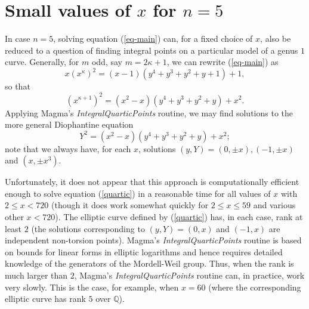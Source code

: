  \section{Small values of $x$ for $n=5$} \label{TM}
 
 In case $n=5$, solving equation (\ref{eq-main}) can, for a fixed choice of $x$, also be reduced to a question of finding integral points on a particular model of a genus $1$ curve.
 Generally, for $m$ odd, say $m= 2 \kappa+1$, we can rewrite  (\ref{eq-main}) as
 $$
 x \left( x^{\kappa} \right)^2 = (x-1) \left( y^4+y^3+y^2+y+1 \right) + 1,
 $$
 so that 
 $$
 \left( x^{\kappa+1} \right)^2 = (x^2-x) \left( y^4+y^3+y^2+y \right) + x^2.
 $$
 Applying Magma's {\it IntegralQuarticPoints} routine, 
 we may find solutions to the more general Diophantine equation
 \begin{equation} \label{quartic}
 Y^2 = (x^2-x) \left( y^4+y^3+y^2+y \right) + x^2;
 \end{equation}
 note that we always have, for each $x$, solutions $(y,Y) = (0, \pm x), (-1, \pm x)$ and $(x, \pm x^3)$. 
 
 Unfortunately, it does not appear that this approach is computationally efficient enough to solve equation (\ref{quartic}) in a reasonable time for all values of $x$ with  $2 \leq x < 720$ (though it does work somewhat quickly for $2 \leq x \leq 59$ and various other $x < 720$). The elliptic curve defined by (\ref{quartic}) has, in each case, rank at least $2$ (the solutions corresponding to $(y,Y) = (0, x)$ and $(-1, x)$ are independent non-torsion points). Magma's {\it IntegralQuarticPoints} routine is based on bounds for  linear forms in elliptic logarithms and hence requires detailed knowledge of the generators of the Mordell-Weil group. Thus, when the rank is much larger than $2$, Magma's   {\it IntegralQuarticPoints} routine can, in practice, work very slowly. This is the case, for example, when $x=60$ (where the corresponding elliptic curve has rank $5$ over $\mathbb{Q}$).  

 
 
